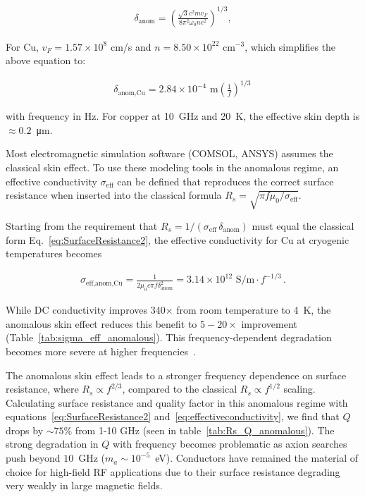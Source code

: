     \begin{align}
        \delta_{\text{anom}} = \left(\frac{\sqrt3c^2 m v_F}{8\pi^2 \omega_0 n e^2}\right)^{1/3} , \label{eq:anomalousskin}
    \end{align}

    \noindent For Cu, $v_F = 1.57 \times 10^8$ cm/s and $n = 8.50 \times 10^{22}$ cm$^{-3}$, which simplifies the above equation to:
    
    \begin{align}
        \delta_{\text{anom,Cu}} = 2.84 \times 10^{-4} \text{ m} \left(\frac{1}{f}\right)^{1/3} \, \label{eq:anomalouscopperskin}
    \end{align}

    \noindent with frequency in Hz. For copper at 10~GHz and 20~K, the effective skin depth is $\approx0.2$~\unit{\um}.

    Most electromagnetic simulation software (COMSOL, ANSYS) assumes the classical skin effect. To use these modeling tools in the anomalous regime, an effective conductivity $\sigma_{\text{eff}}$ can be defined that reproduces the correct surface resistance when inserted into the classical formula $R_s = \sqrt{\pi f \mu_0 / \sigma_{\text{eff}}}$.

    Starting from the requirement that $R_s = 1/(\sigma_{\text{eff}} \,\delta_{\text{anom}})$ must equal the classical form Eq.~\ref{eq:SurfaceResistance2}, the effective conductivity for Cu at cryogenic temperatures becomes 
    
    \begin{align}
        \sigma_{\text{eff,anom,Cu}} = \frac{1}{2\mu_0 c \pi f \delta_{\text{anom}}^2} = 3.14 \times 10^{12} \text{ S/m} \cdot f^{-1/3} \,.\label{eq:effectiveconductivity}
    \end{align}

    \noindent While DC conductivity improves 340$\times$ from room temperature to  4~K, the anomalous skin effect reduces this benefit to $5-20\times$ improvement (Table~\ref{tab:sigma_eff_anomalous}). This frequency-dependent degradation becomes more severe at higher frequencies~\cite{padamseeRFSuperconductivity2009}.

    



    The anomalous skin effect leads to a stronger frequency dependence on surface resistance, where $R_s \propto f^{2/3}$, compared to the classical $R_s \propto f^{1/2}$ scaling. Calculating surface resistance and quality factor in this anomalous regime with equations~\ref{eq:SurfaceResistance2} and~\ref{eq:effectiveconductivity}, we find that $Q$ drops by $\sim 75\%$ from 1-10 GHz (seen in table~\ref{tab:Rs_Q_anomalous}). The strong degradation in $Q$ with frequency becomes problematic as axion searches push beyond $10$~GHz ($m_a \sim 10^{-5}$~eV). Conductors have remained the material of choice for high-field RF applications due to their surface resistance degrading very weakly in large magnetic fields. 


